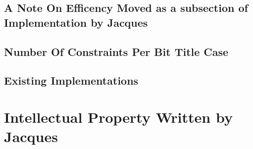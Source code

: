 \documentclass[11pt]{article}
\begin{document}
		\subsection{A Note On Efficency {\color{purple} Moved as a subsection of Implementation by Jacques}}
			\subsection{Number Of Constraints Per Bit  {\color{purple} Title Case}}
			
		\subsection{Existing Implementations}
			

	\section {Intellectual Property  {\color{purple} Written by Jacques}}
		

	
		

\end{document}
